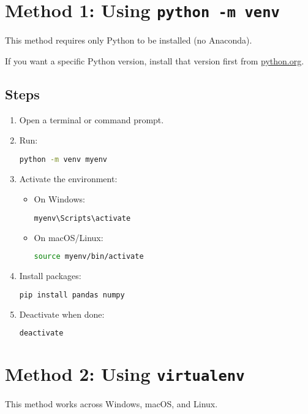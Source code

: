 \section{Method 1: Using \texttt{python -m venv}}
This method requires only Python to be installed (no Anaconda).

\begin{noteBox}
If you want a specific Python version, install that version first from \href{https://www.python.org/downloads/}{python.org}.
\end{noteBox}

\subsection*{Steps}
\begin{enumerate}
    \item Open a terminal or command prompt.
    \item Run:
\begin{lstlisting}[language=bash, caption={Creating a virtual environment using venv}]
python -m venv myenv
\end{lstlisting}
    \item Activate the environment:
        \begin{itemize}
            \item On Windows:
\begin{lstlisting}[language=bash]
myenv\Scripts\activate
\end{lstlisting}
            \item On macOS/Linux:
\begin{lstlisting}[language=bash]
source myenv/bin/activate
\end{lstlisting}
        \end{itemize}
    \item Install packages:
\begin{lstlisting}[language=bash]
pip install pandas numpy
\end{lstlisting}
    \item Deactivate when done:
\begin{lstlisting}[language=bash]
deactivate
\end{lstlisting}
\end{enumerate}

\section{Method 2: Using \texttt{virtualenv}}
This method works across Windows, macOS, and Linux.

